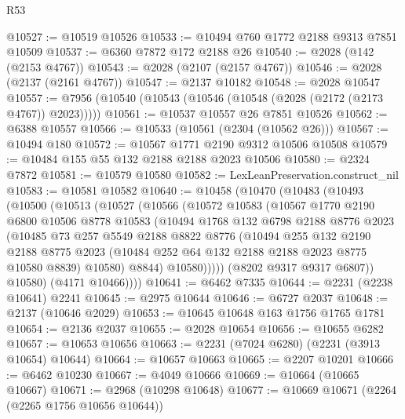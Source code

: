 \begin{lexlean}{R53}
\begin{coremodule}
@10527 := @10519 @10526
@10533 := @10494 @760 @1772 @2188 @9313 @7851 @10509
@10537 := @6360 @7872 @172 @2188 @26
@10540 := @2028 (@142 (@2153 @4767))
@10543 := @2028 (@2107 (@2157 @4767))
@10546 := @2028 (@2137 (@2161 @4767))
@10547 := @2137 @10182
@10548 := @2028 @10547
@10557 := @7956 (@10540 (@10543 (@10546 (@10548 (@2028 (@2172 (@2173 @4767)) @2023)))))
@10561 := @10537 @10557 @26 @7851 @10526
@10562 := @6388 @10557
@10566 := @10533 (@10561 (@2304 (@10562 @26)))
@10567 := @10494 @180
@10572 := @10567 @1771 @2190 @9312 @10506 @10508
@10579 := @10484 @155 @55 @132 @2188 @2188 @2023 @10506
@10580 := @2324 @7872
@10581 := @10579 @10580
@10582 := LexLeanPreservation.construct_nil
@10583 := @10581 @10582
@10640 := @10458
    (@10470
      (@10483
        (@10493
          (@10500
            (@10513
              (@10527
                (@10566
                  (@10572
                    @10583
                    (@10567
                      @1770
                      @2190
                      @6800
                      @10506
                      @8778
                      @10583
                      (@10494
                        @1768
                        @132
                        @6798
                        @2188
                        @8776
                        @2023
                        (@10485
                          @73
                          @257
                          @5549
                          @2188
                          @8822
                          @8776
                          (@10494
                            @255
                            @132
                            @2190
                            @2188
                            @8775
                            @2023
                            (@10484 @252 @64 @132 @2188 @2188 @2023 @8775 @10580 @8839)
                            @10580)
                          @8844)
                        @10580)))))
              (@8202 @9317 @9317 @6807))
            @10580)
          (@4171 @10466))))
@10641 := @6462 @7335
@10644 := @2231 (@2238 @10641) @2241
@10645 := @2975 @10644
@10646 := @6727 @2037
@10648 := @2137 (@10646 @2029)
@10653 := @10645 @10648 @163 @1756 @1765 @1781
@10654 := @2136 @2037
@10655 := @2028 @10654
@10656 := @10655 @6282
@10657 := @10653 @10656
@10663 := @2231 (@7024 @6280) (@2231 (@3913 @10654) @10644)
@10664 := @10657 @10663
@10665 := @2207 @10201
@10666 := @6462 @10230
@10667 := @4049 @10666
@10669 := @10664 (@10665 @10667)
@10671 := @2968 (@10298 @10648)
@10677 := @10669 @10671 (@2264 (@2265 @1756 @10656 @10644))

\end{coremodule}
\end{lexlean}

